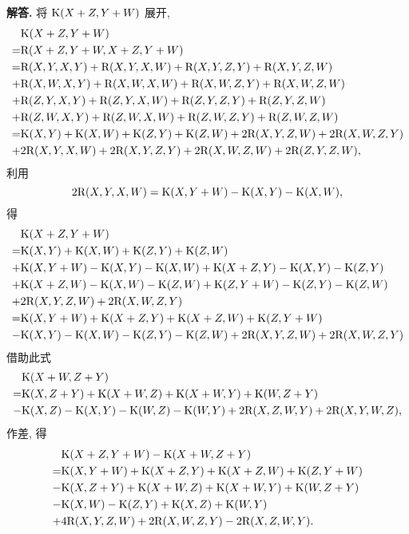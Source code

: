 \documentclass{ctexart}
\newenvironment{solution}{\par\noindent\textbf{解答. }}{\par}
\begin{document}
\begin{solution}
    将 $\mathrm{K}(X + Z, Y + W)$ 展开,
    \[
        \begin{aligned}
             & \mathrm{K}(X + Z, Y + W) \\
            =& \mathrm{R}(X + Z, Y + W, X + Z, Y + W) \\
            =& \mathrm{R}(X, Y, X, Y) + \mathrm{R}(X, Y, X, W) + \mathrm{R}(X, Y, Z, Y) + \mathrm{R}(X, Y, Z, W) \\
            +& \mathrm{R}(X, W, X, Y) + \mathrm{R}(X, W, X, W) + \mathrm{R}(X, W, Z, Y) + \mathrm{R}(X, W, Z, W) \\
            +& \mathrm{R}(Z, Y, X, Y) + \mathrm{R}(Z, Y, X, W) + \mathrm{R}(Z, Y, Z, Y) + \mathrm{R}(Z, Y, Z, W) \\
            +& \mathrm{R}(Z, W, X, Y) + \mathrm{R}(Z, W, X, W) + \mathrm{R}(Z, W, Z, Y) + \mathrm{R}(Z, W, Z, W) \\
            =& \mathrm{K}(X, Y) + \mathrm{K}(X, W) + \mathrm{K}(Z, Y) + \mathrm{K}(Z, W) + 2\mathrm{R}(X, Y, Z, W) + 2\mathrm{R}(X, W, Z, Y) \\
            +& 2\mathrm{R}(X, Y, X, W) + 2\mathrm{R}(X, Y, Z, Y) +2\mathrm{R}(X, W, Z, W) + 2\mathrm{R}(Z, Y, Z, W), 
        \end{aligned}
    \]
    利用
    \[
        2\mathrm{R}(X, Y, X, W) = \mathrm{K}(X, Y + W) - \mathrm{K}(X, Y) - \mathrm{K}(X, W),
    \]
    得
    \[
        \begin{aligned}
             & \mathrm{K}(X + Z, Y + W) \\
            =& \mathrm{K}(X, Y) + \mathrm{K}(X, W) + \mathrm{K}(Z, Y) + \mathrm{K}(Z, W) \\
            +& \mathrm{K}(X, Y + W) - \mathrm{K}(X, Y) - \mathrm{K}(X, W) + \mathrm{K}(X + Z, Y) - \mathrm{K}(X, Y) - \mathrm{K}(Z, Y) \\
            +& \mathrm{K}(X + Z, W) - \mathrm{K}(X, W) - \mathrm{K}(Z, W) + \mathrm{K}(Z, Y + W) - \mathrm{K}(Z, Y) - \mathrm{K}(Z, W) \\
            +& 2\mathrm{R}(X, Y, Z, W) + 2\mathrm{R}(X, W, Z, Y) \\
            =& \mathrm{K}(X, Y + W) + \mathrm{K}(X + Z, Y) + \mathrm{K}(X + Z, W) + \mathrm{K}(Z, Y + W) \\
            -& \mathrm{K}(X, Y) - \mathrm{K}(X, W) - \mathrm{K}(Z, Y) - \mathrm{K}(Z, W) + 2\mathrm{R}(X, Y, Z, W) + 2\mathrm{R}(X, W, Z, Y)
       \end{aligned}
    \]
    借助此式
    \[
        \begin{aligned}
             & \mathrm{K}(X + W, Z + Y) \\
            =& \mathrm{K}(X, Z + Y) + \mathrm{K}(X + W, Z) + \mathrm{K}(X + W, Y) + \mathrm{K}(W, Z + Y) \\
            -& \mathrm{K}(X, Z) - \mathrm{K}(X, Y) - \mathrm{K}(W, Z) - \mathrm{K}(W, Y) + 2\mathrm{R}(X, Z, W, Y) + 2\mathrm{R}(X, Y, W, Z),
        \end{aligned}
    \]
    作差, 得
    \[
        \begin{aligned}
             & \mathrm{K}(X + Z, Y + W) - \mathrm{K}(X + W, Z + Y) \\
            =& \mathrm{K}(X, Y + W) + \mathrm{K}(X + Z, Y) + \mathrm{K}(X + Z, W) + \mathrm{K}(Z, Y + W) \\
            -& \mathrm{K}(X, Z + Y) + \mathrm{K}(X + W, Z) + \mathrm{K}(X + W, Y) + \mathrm{K}(W, Z + Y) \\
            -& \mathrm{K}(X, W) - \mathrm{K}(Z, Y) + \mathrm{K}(X, Z) + \mathrm{K}(W, Y) \\
            +& 4\mathrm{R}(X, Y, Z, W) + 2\mathrm{R}(X, W, Z, Y) - 2\mathrm{R}(X, Z, W, Y).
        \end{aligned}
    \]
    

\end{solution}
\end{document}
